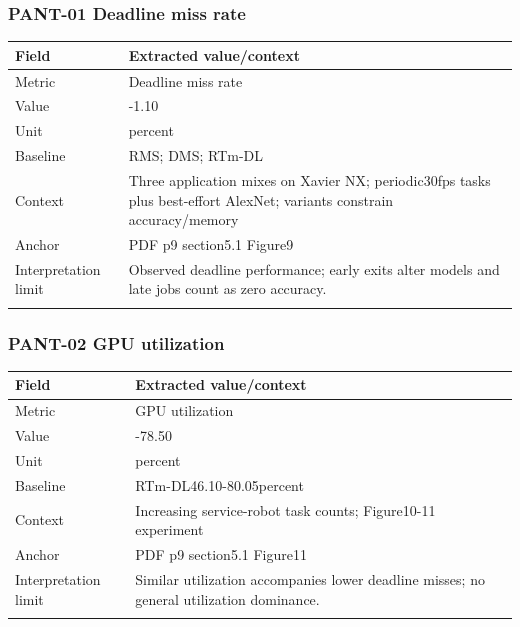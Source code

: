 \subsubsection*{PANT-01 Deadline miss rate}
\begin{longtable}{>{\raggedright\arraybackslash}p{}>{\raggedright\arraybackslash}p{}}
\toprule
\textbf{Field} & \textbf{Extracted value/context}\\\midrule\endhead
Metric & Deadline miss rate\\\addlinespace
Value & 0.39-1.10\\\addlinespace
Unit & percent\\\addlinespace
Baseline & RMS;\allowbreak{} DMS;\allowbreak{} RTm-DL\\\addlinespace
Context & Three application mixes on Xavier NX;\allowbreak{} periodic30fps tasks plus best-effort AlexNet;\allowbreak{} variants constrain accuracy/memory\\\addlinespace
Anchor & PDF p9 section5.1 Figure9\\\addlinespace
Interpretation limit & Observed deadline performance;\allowbreak{} early exits alter models and late jobs count as zero accuracy.\\\addlinespace
\bottomrule\end{longtable}
\subsubsection*{PANT-02 GPU utilization}
\begin{longtable}{>{\raggedright\arraybackslash}p{}>{\raggedright\arraybackslash}p{}}
\toprule
\textbf{Field} & \textbf{Extracted value/context}\\\midrule\endhead
Metric & GPU utilization\\\addlinespace
Value & 50.85-78.50\\\addlinespace
Unit & percent\\\addlinespace
Baseline & RTm-DL46.10-80.05percent\\\addlinespace
Context & Increasing service-robot task counts;\allowbreak{} Figure10-11 experiment\\\addlinespace
Anchor & PDF p9 section5.1 Figure11\\\addlinespace
Interpretation limit & Similar utilization accompanies lower deadline misses;\allowbreak{} no general utilization dominance.\\\addlinespace
\bottomrule\end{longtable}
